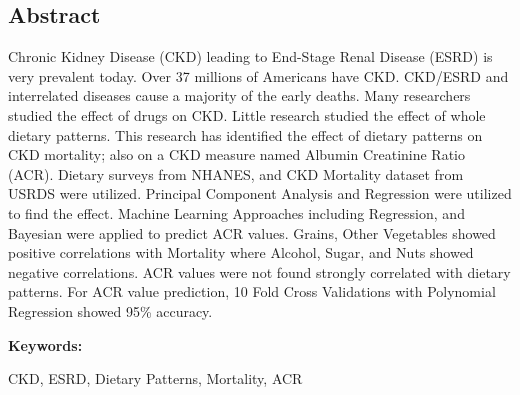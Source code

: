 \begin{center} \section*{Abstract} \end{center}
Chronic Kidney Disease (CKD) leading to End-Stage Renal Disease (ESRD) is very prevalent today. Over 37 millions of Americans have CKD. CKD/ESRD and interrelated diseases cause a majority of the early deaths.  Many researchers studied the effect of drugs on CKD. Little research studied the effect of  whole dietary patterns. This research has identified the effect of dietary patterns on CKD mortality; also on a CKD measure named Albumin Creatinine Ratio (ACR). Dietary surveys from NHANES, and CKD Mortality dataset from USRDS were utilized. Principal Component Analysis and Regression were utilized to find the effect. Machine Learning Approaches including Regression, and Bayesian were applied to predict ACR values. Grains, Other Vegetables showed positive correlations with Mortality where Alcohol, Sugar, and Nuts showed negative correlations. ACR values were not found strongly correlated with dietary patterns. For ACR value prediction, 10 Fold Cross Validations with Polynomial Regression showed 95\% accuracy.

\medskip
\noindent \textbf{Keywords:} 

\noindent CKD, ESRD, Dietary Patterns, Mortality, ACR